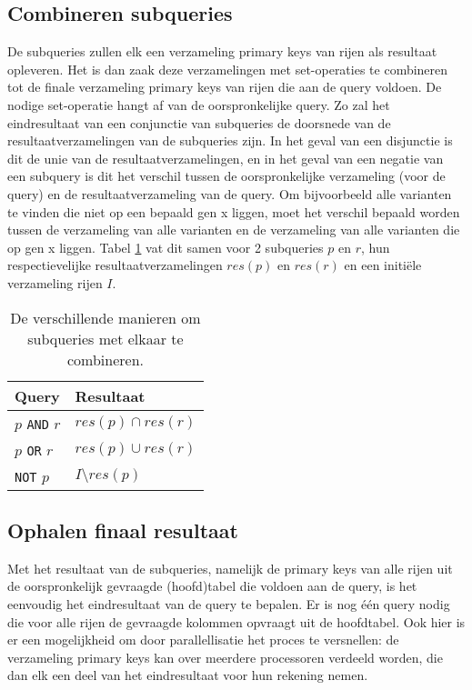 \subsection{Combineren subqueries}
\label{comb_subq_concept}
De subqueries zullen elk een verzameling primary keys van rijen als resultaat opleveren. Het is dan zaak deze verzamelingen met set-operaties te combineren tot de finale verzameling primary keys van rijen die aan de query voldoen. De nodige set-operatie hangt af van de oorspronkelijke query. Zo zal het eindresultaat van een conjunctie van subqueries de doorsnede van de resultaatverzamelingen van de subqueries zijn. In het geval van een disjunctie is dit de unie van de resultaatverzamelingen, en in het geval van een negatie van een subquery is dit het verschil tussen de oorspronkelijke verzameling (voor de query) en de resultaatverzameling van de query. Om bijvoorbeeld alle varianten te vinden die niet op een bepaald gen x liggen, moet het verschil bepaald worden tussen de verzameling van alle varianten en de verzameling van alle varianten die op gen x liggen. Tabel \ref{combineren_subqueries} vat dit samen voor 2 subqueries $p$ en $r$, hun respectievelijke resultaatverzamelingen $res(p)$ en $res(r)$ en een initi\"ele verzameling rijen $I$.

\begin{table}[h]
\centering
\begin{tabular}{|l|l|}
\hline
\textbf{Query} & \textbf{Resultaat}    \\ \hline
$p$ \texttt{AND} $r$ & $res(p) \cap res(r)$   \\ \hline
$p$ \texttt{OR} $r$ & $res(p) \cup res(r)$    \\ \hline
\texttt{NOT} $p$  & $I \setminus res(p)$ \\ \hline
\end{tabular}
\caption{De verschillende manieren om subqueries met elkaar te combineren.}
\label{combineren_subqueries}
\end{table}

\subsection{Ophalen finaal resultaat}

Met het resultaat van de subqueries, namelijk de primary keys van alle rijen uit de oorspronkelijk gevraagde (hoofd)tabel die voldoen aan de query, is het eenvoudig het eindresultaat van de query te bepalen. Er is nog \'e\'en query nodig die voor alle rijen de gevraagde kolommen opvraagt uit de hoofdtabel. Ook hier is er een mogelijkheid om door parallellisatie het proces te versnellen: de verzameling primary keys kan over meerdere processoren verdeeld worden, die dan elk een deel van het eindresultaat voor hun rekening nemen. 

